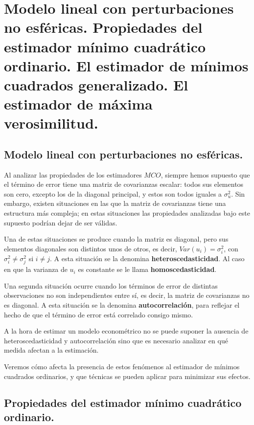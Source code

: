 
\chapter{Modelo lineal con perturbaciones no esf\'ericas. Propiedades del estimador
m\'inimo cuadr\'atico ordinario. El estimador de m\'inimos cuadrados generalizado.
El estimador de m\'axima verosimilitud.}


\section{Modelo lineal con perturbaciones no esf\'ericas.}

Al analizar las propiedades de los estimadores $MCO$, siempre hemos
supuesto que el t\'ermino de error tiene una matriz de covarianzas escalar:
todos sus elementos son cero, excepto los de la diagonal principal,
y estos son todos iguales a $\sigma_{u}^{2}$. Sin embargo, existen
situaciones en las que la matriz de covarianzas tiene una estructura
m\'as compleja; en estas situaciones las propiedades analizadas bajo
este supuesto podr\'ian dejar de ser v\'alidas.

Una de estas situaciones se produce cuando la matriz es diagonal,
pero sus elementos diagonales son distintos unos de otros, es decir,
$Var(u_{i})=\sigma_{i}^{2}$, con $\sigma_{i}^{2}\neq\sigma_{j}^{2}$
si $i\neq j$. A esta situaci\'on se la denomina \textbf{heteroscedasticidad}.
Al caso en que la varianza de $u_{i}$ es constante se le llama \textbf{homoscedasticidad}.

Una segunda situaci\'on ocurre cuando los t\'erminos de error de distintas
observaciones no son independientes entre s\'i, es decir, la matriz
de covarianzas no es diagonal. A esta situaci\'on se la denomina \textbf{autocorrelaci\'on},
para reflejar el hecho de que el t\'ermino de error est\'a correlado consigo
mismo.

A la hora de estimar un modelo econom\'etrico no se puede suponer la
ausencia de heteroscedasticidad y autocorrelaci\'on sino que es necesario
analizar en qu\'e medida afectan a la estimaci\'on.

Veremos c\'omo afecta la presencia de estos fen\'omenos al estimador de
m\'inimos cuadrados ordinarios, y que t\'ecnicas se pueden aplicar para
minimizar sus efectos.


\section{Propiedades del estimador m\'inimo cuadr\'atico ordinario.}

